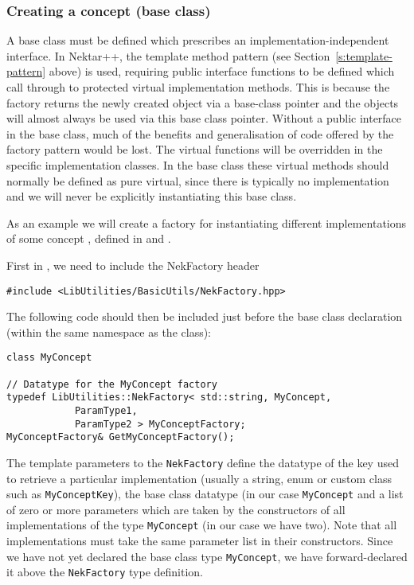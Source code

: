 \subsubsection{Creating a concept (base class)}
A base class must be defined which prescribes an implementation-independent
interface. In Nektar++, the template method pattern (see Section~\ref{s:template-pattern} above) is used, requiring public
interface functions to be defined which call through to protected virtual implementation methods. This is because the factory returns the newly created object via a base-class pointer and the objects will almost always be used via this base class pointer. Without a public interface in the base class, much of the benefits and generalisation of code offered by the factory pattern would be lost.
The virtual functions will be overridden in the specific implementation classes.
In the base class these virtual methods should normally be defined as pure virtual, since there is typically no implementation and we will never be explicitly instantiating this base class.

As an example we will create a factory for instantiating different
implementations of some concept , defined in
 and .

First in , we need to include the NekFactory header
\begin{lstlisting}
#include <LibUtilities/BasicUtils/NekFactory.hpp>
\end{lstlisting}

The following code should then be included just before the base class
declaration (within the same namespace as the class):
\begin{lstlisting}
class MyConcept

// Datatype for the MyConcept factory
typedef LibUtilities::NekFactory< std::string, MyConcept, 
            ParamType1,
            ParamType2 > MyConceptFactory;
MyConceptFactory& GetMyConceptFactory();
\end{lstlisting}

The template parameters to the \lstinline{NekFactory} define the datatype of the key used to retrieve a
particular implementation (usually a string, enum or custom class such as
\lstinline{MyConceptKey}), the base class datatype (in our case \lstinline{MyConcept} and a list
of zero or more parameters which are taken by the constructors of all
implementations of the type \lstinline{MyConcept} (in our case we have two). Note
that all implementations must take the same parameter list in their constructors. Since we have not yet declared the base class type \lstinline{MyConcept}, we have forward-declared it above the \lstinline{NekFactory} type definition.

